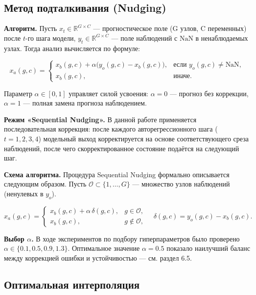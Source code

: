 \documentclass[14pt,a4paper]{extarticle}
\numberwithin{table}{section}
\numberwithin{figure}{section}
\numberwithin{equation}{section}
\begin{document}
\subsection{Метод подталкивания (Nudging)}\label{ux43cux435ux442ux43eux434-ux43fux43eux434ux442ux430ux43bux43aux438ux432ux430ux43dux438ux44f-nudging}

\textbf{Алгоритм.} Пусть \(x_t \in \mathbb{R}^{G \times C}\) ---
прогностическое поле (G узлов, C переменных) после \(t\)-го шага модели,
\(y_t \in \mathbb{R}^{G \times C}\) --- поле наблюдений с \(\text{NaN}\)
в ненаблюдаемых узлах. Тогда анализ вычисляется по формуле:

\[x_a(g, c) = \begin{cases}
x_b(g,c) + \alpha \bigl(y_o(g,c) - x_b(g,c)\bigr), & \text{если } y_o(g,c) \neq \text{NaN}, \\
x_b(g,c), & \text{иначе}.
\end{cases}\]

Параметр \(\alpha \in [0, 1]\) управляет силой усвоения: \(\alpha = 0\)
--- прогноз без коррекции, \(\alpha = 1\) --- полная замена прогноза
наблюдением.

\textbf{Режим «Sequential Nudging».} В данной работе применяется
последовательная коррекция: после каждого авторегрессионного шага
(\(t = 1, 2, 3, 4\)) модельный выход корректируется на основе
соответствующего среза наблюдений, после чего скорректированное
состояние подаётся на следующий шаг.

\textbf{Схема алгоритма.} Процедура Sequential Nudging формально
описывается следующим образом. Пусть
\(\mathcal{O} \subset \{1,\ldots,G\}\) --- множество узлов наблюдений
(ненулевых в \(y_o\)).

\[x_a(g, c) = \begin{cases} x_b(g,c) + \alpha\,\delta(g,c), & g \in \mathcal{O},\\ x_b(g,c), & g \notin \mathcal{O}, \end{cases} \quad \delta(g,c) = y_o(g,c) - x_b(g,c).\]

\textbf{Выбор \(\alpha\).} В ходе экспериментов по подбору
гиперпараметров было проверено \(\alpha \in \{0.1, 0.5, 0.9, 1.3\}\).
Оптимальное значение \(\alpha = 0.5\) показало наилучший баланс между
коррекцией ошибки и устойчивостью --- см. раздел 6.5.

\subsection{Оптимальная интерполяция}\label{ux43eux43fux442ux438ux43cux430ux43bux44cux43dux430ux44f-ux438ux43dux442ux435ux440ux43fux43eux43bux44fux446ux438ux44f}
\end{document}
